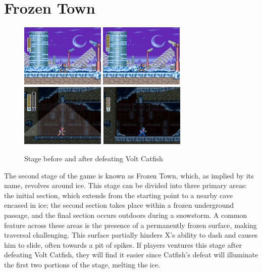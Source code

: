 \section{Frozen Town}
\begin{figure}[htp]
	\centering
	\includegraphics[height=3cm]{figures/X3/Blizzard_buffalo/Stage_1.jpg}
	\includegraphics[height=3cm]{figures/X3/Blizzard_buffalo/Stage_2.jpg}
	\includegraphics[height=3cm]{figures/X3/Blizzard_buffalo/Stage_11.jpg}
	\includegraphics[height=3cm]{figures/X3/Blizzard_buffalo/Stage_12.jpg}
	\caption{Stage before and after defeating Volt Catfish}
\end{figure}

The second stage of the game is known as Frozen Town, which, as implied by its name, revolves around ice. This stage can be divided into three primary areas: the initial section, which extends from the starting point to a nearby cave encased in ice; the second section takes place within a frozen underground passage, and the final section occurs outdoors during a snowstorm. A common feature across these areas is the presence of a permanently frozen surface, making traversal challenging. This surface partially hinders X's ability to dash and causes him to slide, often towards a pit of spikes. If players ventures this stage after defeating Volt Catfish, they will find it easier since Catfish's defeat will illuminate the first two portions of the stage, melting the ice.

